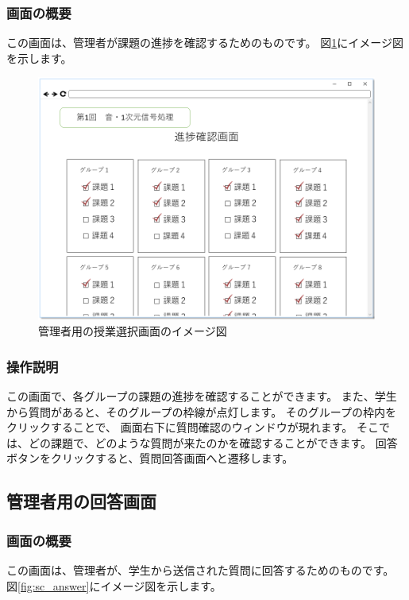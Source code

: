 \subsubsection{画面の概要}
この画面は、管理者が課題の進捗を確認するためのものです。
図\ref{fig:sc_prog_check}にイメージ図を示します。

\begin{figure}[htbp]
\begin{center}
  \includegraphics[width=1\linewidth,clip]{./img/sc_prog_check.png}
  \caption{管理者用の授業選択画面のイメージ図}\label{fig:sc_prog_check}
\end{center}
\end{figure}

\subsubsection{操作説明}
この画面で、各グループの課題の進捗を確認することができます。
また、学生から質問があると、そのグループの枠線が点灯します。
そのグループの枠内をクリックすることで、
画面右下に質問確認のウィンドウが現れます。
そこでは、どの課題で、どのような質問が来たのかを確認することができます。
回答ボタンをクリックすると、質問回答画面へと遷移します。

\subsection{管理者用の回答画面}
\subsubsection{画面の概要}
この画面は、管理者が、学生から送信された質問に回答するためのものです。
図\ref{fig:sc_answer}にイメージ図を示します。

